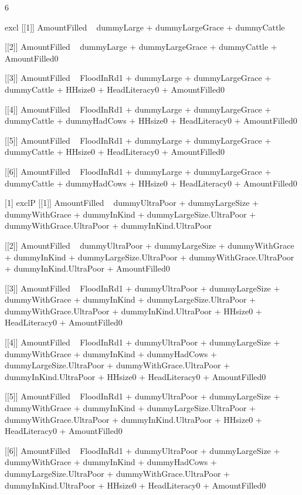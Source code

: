 \begin{Schunk}
\begin{Soutput}
[1] 6
\end{Soutput}
\begin{Soutput}
[1] excl
[[1]]
AmountFilled ~ dummyLarge + dummyLargeGrace + dummyCattle

[[2]]
AmountFilled ~ dummyLarge + dummyLargeGrace + dummyCattle + AmountFilled0

[[3]]
AmountFilled ~ FloodInRd1 + dummyLarge + dummyLargeGrace + dummyCattle + 
    HHsize0 + HeadLiteracy0 + AmountFilled0

[[4]]
AmountFilled ~ FloodInRd1 + dummyLarge + dummyLargeGrace + dummyCattle + 
    dummyHadCows + HHsize0 + HeadLiteracy0 + AmountFilled0

[[5]]
AmountFilled ~ FloodInRd1 + dummyLarge + dummyLargeGrace + dummyCattle + 
    HHsize0 + HeadLiteracy0 + AmountFilled0

[[6]]
AmountFilled ~ FloodInRd1 + dummyLarge + dummyLargeGrace + dummyCattle + 
    dummyHadCows + HHsize0 + HeadLiteracy0 + AmountFilled0

[1] exclP
[[1]]
AmountFilled ~ dummyUltraPoor + dummyLargeSize + dummyWithGrace + 
    dummyInKind + dummyLargeSize.UltraPoor + dummyWithGrace.UltraPoor + 
    dummyInKind.UltraPoor

[[2]]
AmountFilled ~ dummyUltraPoor + dummyLargeSize + dummyWithGrace + 
    dummyInKind + dummyLargeSize.UltraPoor + dummyWithGrace.UltraPoor + 
    dummyInKind.UltraPoor + AmountFilled0

[[3]]
AmountFilled ~ FloodInRd1 + dummyUltraPoor + dummyLargeSize + 
    dummyWithGrace + dummyInKind + dummyLargeSize.UltraPoor + 
    dummyWithGrace.UltraPoor + dummyInKind.UltraPoor + HHsize0 + 
    HeadLiteracy0 + AmountFilled0

[[4]]
AmountFilled ~ FloodInRd1 + dummyUltraPoor + dummyLargeSize + 
    dummyWithGrace + dummyInKind + dummyHadCows + dummyLargeSize.UltraPoor + 
    dummyWithGrace.UltraPoor + dummyInKind.UltraPoor + HHsize0 + 
    HeadLiteracy0 + AmountFilled0

[[5]]
AmountFilled ~ FloodInRd1 + dummyUltraPoor + dummyLargeSize + 
    dummyWithGrace + dummyInKind + dummyLargeSize.UltraPoor + 
    dummyWithGrace.UltraPoor + dummyInKind.UltraPoor + HHsize0 + 
    HeadLiteracy0 + AmountFilled0

[[6]]
AmountFilled ~ FloodInRd1 + dummyUltraPoor + dummyLargeSize + 
    dummyWithGrace + dummyInKind + dummyHadCows + dummyLargeSize.UltraPoor + 
    dummyWithGrace.UltraPoor + dummyInKind.UltraPoor + HHsize0 + 
    HeadLiteracy0 + AmountFilled0


\end{Soutput}
\end{Schunk}
